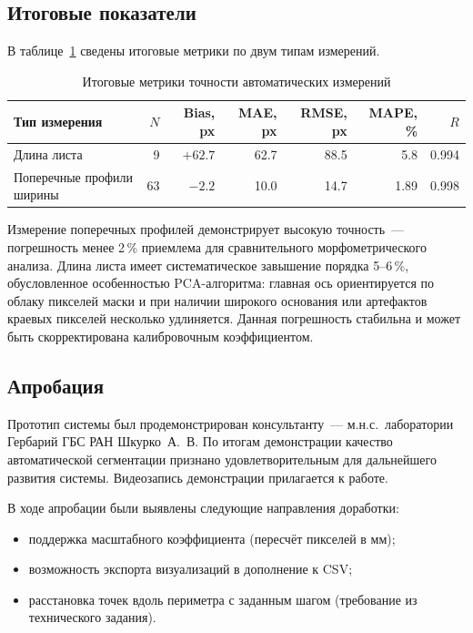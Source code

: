 \subsection{Итоговые показатели}

В таблице~\ref{tab:summary} сведены итоговые метрики по двум типам измерений.

\begin{table}[H]
\centering
\caption{Итоговые метрики точности автоматических измерений}
\label{tab:summary}
\begin{tabular}{lrrrrrr}
\hline
\textbf{Тип измерения} & $N$ & \textbf{Bias, px} & \textbf{MAE, px} & \textbf{RMSE, px} & \textbf{MAPE, \%} & $R$ \\
\hline
Длина листа              &  9 & $+62.7$ & 62.7 & 88.5 & 5.8  & 0.994 \\
Поперечные профили ширины& 63 &  $-2.2$ & 10.0 & 14.7 & 1.89 & 0.998 \\
\hline
\end{tabular}
\end{table}

Измерение поперечных профилей демонстрирует высокую точность~--- погрешность менее 2\,\%
приемлема для сравнительного морфометрического анализа.
Длина листа имеет систематическое завышение порядка 5--6\,\%, обусловленное особенностью
PCA-алгоритма: главная ось ориентируется по облаку пикселей маски и при наличии широкого
основания или артефактов краевых пикселей несколько удлиняется.
Данная погрешность стабильна и может быть скорректирована калибровочным коэффициентом.

\subsection{Апробация}

Прототип системы был продемонстрирован консультанту~--- м.н.с.\ лаборатории Гербарий ГБС РАН
Шкурко~А.~В. По итогам демонстрации качество автоматической сегментации признано
удовлетворительным для дальнейшего развития системы.
Видеозапись демонстрации прилагается к работе.

В ходе апробации были выявлены следующие направления доработки:
\begin{itemize}
    \item поддержка масштабного коэффициента (пересчёт пикселей в мм);
    \item возможность экспорта визуализаций в дополнение к CSV;
    \item расстановка точек вдоль периметра с заданным шагом (требование из технического задания).
\end{itemize}
